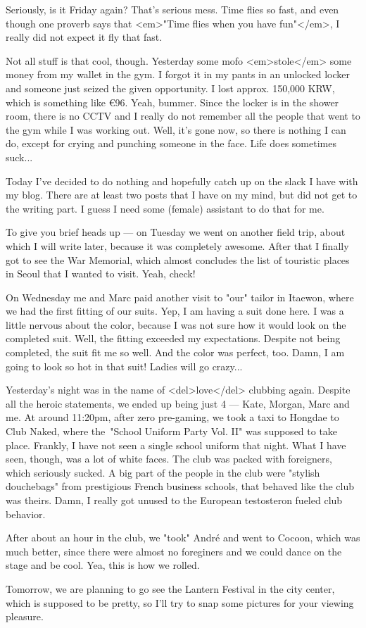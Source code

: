 \begin{post}
	\begin{content}
Seriously, is it Friday again? That's serious mess. Time flies so fast, and even though one proverb says that <em>"Time flies when you have fun"</em>, I really did not expect it fly that fast.

Not all stuff is that cool, though. Yesterday some mofo <em>stole</em> some money from my wallet in the gym. I forgot it in my pants in an unlocked locker and someone just seized the given opportunity. I lost approx. 150,000 KRW, which is something like €96. Yeah, bummer. Since the locker is in the shower room, there is no CCTV and I really do not remember all the people that went to the gym while I was working out. Well, it's gone now, so there is nothing I can do, except for crying and punching someone in the face. Life does sometimes suck...

Today I've decided to do nothing and hopefully catch up on the slack I have with my blog. There are at least two posts that I have on my mind, but did not get to the writing part. I guess I need some (female) assistant to do that for me.

To give you brief heads up — on Tuesday we went on another field trip, about which I will write later, because it was completely awesome. After that I finally got to see the War Memorial, which almost concludes the list of touristic places in Seoul that I wanted to visit. Yeah, check!

On Wednesday me and Marc paid another visit to "our" tailor in Itaewon, where we had the first fitting of our suits. Yep, I am having a suit done here. I was a little nervous about the color, because I was not sure how it would look on the completed suit. Well, the fitting exceeded my expectations. Despite not being completed, the suit fit me so well. And the color was perfect, too. Damn, I am going to look so hot in that suit! Ladies will go crazy...

Yesterday's night was in the name of <del>love</del> clubbing again. Despite all the heroic statements, we ended up being just 4 — Kate, Morgan, Marc and me. At around 11:20pm, after zero pre-gaming, we took a taxi to Hongdae to Club Naked, where the "School Uniform Party Vol. II" was supposed to take place. Frankly, I have not seen a single school uniform that night. What I have seen, though, was a lot of white faces. The club was packed with foreigners, which seriously sucked. A big part of the people in the club were "stylish douchebags" from prestigious French business schools, that behaved like the club was theirs. Damn, I really got unused to the European testosteron fueled club behavior.

After about an hour in the club, we "took" André and went to Cocoon, which was much better, since there were almost no foreginers and we could dance on the stage and be cool. Yea, this is how we rolled.

Tomorrow, we are planning to go see the Lantern Festival in the city center, which is supposed to be pretty, so I'll try to snap some pictures for your viewing pleasure.
	\end{content}
\end{post}

